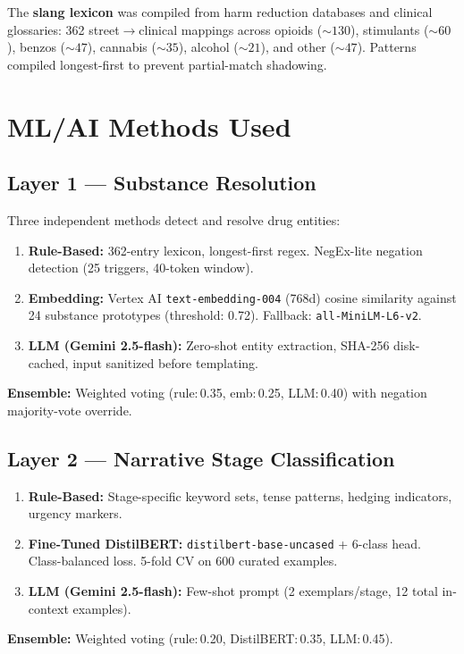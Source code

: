 \documentclass[10pt,twocolumn]{article}
\begin{document}
The \textbf{slang lexicon} was compiled from harm reduction databases and
clinical glossaries: 362 street$\to$clinical mappings across opioids
(${\sim}130$), stimulants (${\sim}60$), benzos (${\sim}47$), cannabis
(${\sim}35$), alcohol (${\sim}21$), and other (${\sim}47$). Patterns compiled
longest-first to prevent partial-match shadowing.


\section{ML/AI Methods Used}

\subsection{Layer 1 --- Substance Resolution}

Three independent methods detect and resolve drug entities:
\begin{enumerate}
  \item \textbf{Rule-Based:} 362-entry lexicon, longest-first regex. NegEx-lite
    negation detection (25 triggers, 40-token window).
  \item \textbf{Embedding:} Vertex AI \texttt{text-embedding-004} (768d)
    cosine similarity against 24 substance prototypes (threshold: 0.72).
    Fallback: \texttt{all-MiniLM-L6-v2}.
  \item \textbf{LLM (Gemini 2.5-flash):} Zero-shot entity extraction,
    SHA-256 disk-cached, input sanitized before templating.
\end{enumerate}
\textbf{Ensemble:} Weighted voting (rule:\,0.35, emb:\,0.25, LLM:\,0.40)
with negation majority-vote override.

\subsection{Layer 2 --- Narrative Stage Classification}

\begin{enumerate}
  \item \textbf{Rule-Based:} Stage-specific keyword sets, tense patterns,
    hedging indicators, urgency markers.
  \item \textbf{Fine-Tuned DistilBERT:} \texttt{distilbert-base-uncased} +
    6-class head. Class-balanced loss. 5-fold CV on 600 curated examples.
  \item \textbf{LLM (Gemini 2.5-flash):} Few-shot prompt (2 exemplars/stage,
    12 total in-context examples).
\end{enumerate}
\textbf{Ensemble:} Weighted voting (rule:\,0.20, DistilBERT:\,0.35, LLM:\,0.45).
\end{document}
